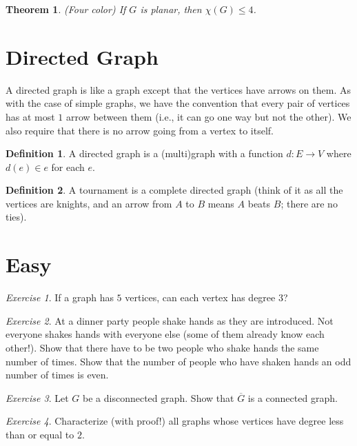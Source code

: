 \documentclass{article}
\newtheorem{theorem}{Theorem}[section]
\theoremstyle{definition}
\newtheorem{definition}{Definition}[section]
\theoremstyle{remark}
\newtheorem{exercise}{Exercise}
\begin{document}
\begin{theorem}(Four color)
If $G$ is planar, then $\chi(G)\leq 4$. 
\end{theorem}

\section{Directed Graph}
A directed graph is like a graph except that the vertices have arrows on them. As with the case of simple graphs, we have the convention that every pair of vertices has at most $1$ arrow between them (i.e., it can go one way but not the other). We also require that there is no arrow going from a vertex to itself.

\begin{definition}
A directed graph is a (multi)graph with a function $d: E \rightarrow V$ where $d(e) \in e$ for each $e$.  
\end{definition}

\begin{definition}
A tournament is a complete directed graph (think of it as all the vertices are knights, and an arrow from $A$ to $B$ means $A$ beats $B$; there are no ties).
\end{definition}

\section{Easy}
\begin{exercise}
If a graph has $5$ vertices, can each vertex has degree $3$? 
\end{exercise}

\begin{exercise}
At a dinner party people shake hands as they are introduced. Not everyone shakes hands with everyone else (some of them already know each other!). Show that there have to be two people who shake hands the same number of times. Show that the number of people who have shaken hands an odd number of times is even.
\end{exercise}

\begin{exercise}
Let $G$ be a disconnected graph. Show that $\overline{G}$ is a connected graph.
\end{exercise}

\begin{exercise}
Characterize (with proof!) all graphs whose vertices have degree less than or equal to $2$.
\end{exercise}
\end{document}
